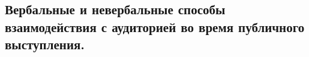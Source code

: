 \documentclass[a4paper,12pt]{article}
\begin{document}
\begin{large}

\setlength{\parindent}{20pt} 
\section{Вербальные и невербальные способы взаимодействия с аудиторией во время публичного выступления.}
\end{large}
\end{document}
